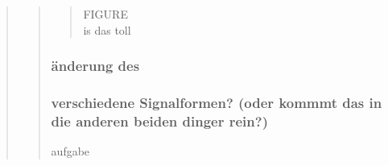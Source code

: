 \begin{quote}
\begin{quote}
\begin{quote}
            FIGURE\\
            
            is das toll\\
        \end{quote}


        \subsubsection{änderung des \alpha }
        \begin{quote}
            
        \end{quote}


        \subsubsection{verschiedene Signalformen? (oder kommmt das in die anderen beiden dinger rein?)}
        aufgabe
        \begin{quote}
            
        \end{quote}


        
        
        
    \end{quote}
    
\end{quote}









%     
%         

% 
% 
% 



